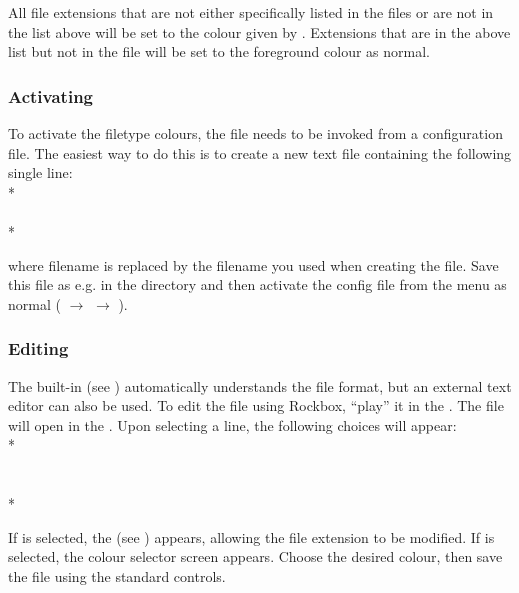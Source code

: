 {  All file extensions that are not either specifically listed in the
   files or are not in the list above will be
  set to the colour given by . Extensions that
  are in the above list but not in the 
  file will be set to the foreground colour as normal.

  \subsubsection{Activating}
  To activate the filetype colours, the  file needs to be
  invoked from a  configuration file. The easiest way to do
  this is to create a new text file containing the following single
  line:\\*
  \\
  \\*

  where filename is replaced by the filename you used when creating the
   file. Save this file as e.g.  in the
   directory and then activate the config file
  from the menu as normal
  ( $\rightarrow$ %
  $\rightarrow$ ).

  \subsubsection{Editing}
  The built-in  (see )
  automatically understands the
   file format, but an external text editor can
  also be used. To edit the  file using Rockbox,
  ``play'' it in the . The file will open in 
  the . Upon selecting a line, the following choices
  will appear:\\*
  \\
  \\
  \\*

  If  is selected, the 
  (see ) appears,
  allowing the file extension to be modified. If 
  is selected, the colour selector screen appears. Choose the desired
  colour, then save the  file using the standard
   controls.
}


